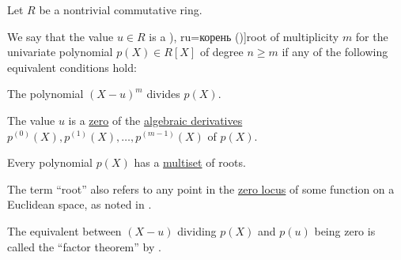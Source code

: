 \begin{definition}\label{def:polynomial_root}\mimprovised
  Let \( R \) be a nontrivial commutative ring.

  We say that the value \( u \in R \) is a \term[bg=корен (\cite[33]{ГеновМиховскиМоллов1991}), ru=корень (\cite[99]{Винберг2014})]{root} of multiplicity \( m \) for the univariate polynomial \( p(X) \in R[X] \) of degree \( n \geq m \) if any of the following equivalent conditions hold:
  \begin{thmenum}
     The polynomial \( (X - u)^m \) divides \( p(X) \).

     The value \( u \) is a \hyperref[def:zero_locus]{zero} of the \hyperref[def:algebraic_derivative]{algebraic derivatives} \( p^{(0)}(X), p^{(1)}(X), \ldots, p^{(m-1)}(X) \) of \( p(X) \).
  \end{thmenum}

  Every polynomial \( p(X) \) has a \hyperref[def:labeled_set/multiset]{multiset} of roots.
\end{definition}
\begin{comments}
  \item The term \enquote{root} also refers to any point in the \hyperref[def:zero_locus]{zero locus} of some function on a Euclidean space, as noted in .

  \item The equivalent between \( (X - u) \) dividing \( p(X) \) and \( p(u) \) being zero is called the \enquote{factor theorem} by .
\end{comments}
